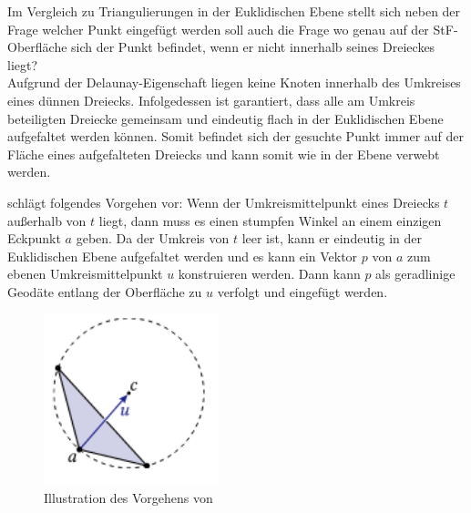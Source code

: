 Im Vergleich zu Triangulierungen in der Euklidischen Ebene stellt sich neben der Frage welcher Punkt eingefügt werden soll auch die Frage wo genau auf der StF-Oberfläche sich der Punkt befindet, wenn er nicht innerhalb seines Dreieckes liegt? \\

Aufgrund der Delaunay-Eigenschaft liegen keine Knoten innerhalb des Umkreises eines dünnen Dreiecks. Infolgedessen ist  garantiert, dass alle am Umkreis beteiligten Dreiecke gemeinsam und eindeutig flach in der Euklidischen Ebene aufgefaltet werden können. Somit befindet sich der gesuchte Punkt immer auf der Fläche eines aufgefalteten Dreiecks und kann somit wie in der Ebene verwebt werden. 


\citet{Sharp:2019:NIT} schlägt folgendes Vorgehen vor:
Wenn der Umkreismittelpunkt eines Dreiecks $t$ außerhalb von
$t$ liegt, dann muss es einen stumpfen Winkel an einem einzigen
Eckpunkt $a$ geben. Da der Umkreis von $t$ leer ist, kann er
eindeutig in der Euklidischen Ebene aufgefaltet werden  und es kann ein Vektor $p$ von $a$ zum ebenen Umkreismittelpunkt $u$ konstruieren werden. Dann kann $p$ als geradlinige Geodäte \cite{Polthier:2006:SIGGRAPH} entlang der Oberfläche zu $u$ verfolgt und eingefügt werden.

 \begin{figure}[h]
    \centering
    \includegraphics[width=2in]{images/auffaltung_punkteinfuegen.png}
    \caption{Illustration des Vorgehens von \citeauthor{Sharp:2019:NIT} \cite{Sharp:2019:NIT} }%
    \label{fig:Punkt_einfügen}
\end{figure}

